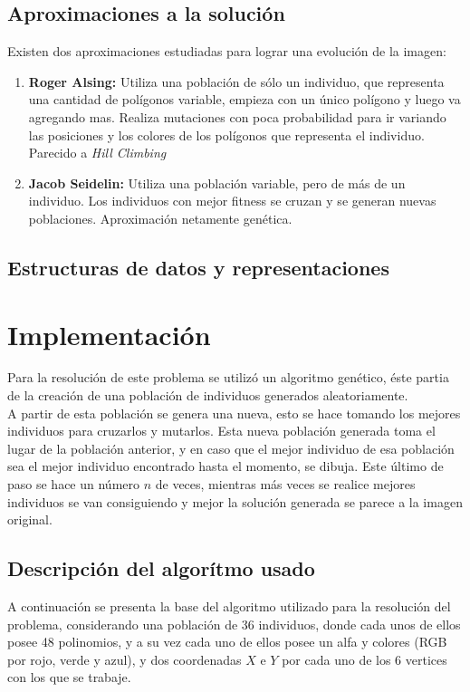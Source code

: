 \documentclass[11pt, spanish]{article}
\begin{document}
\subsection{Aproximaciones a la solución}
Existen dos aproximaciones estudiadas para lograr una evolución de la imagen:

\begin{enumerate}
	\item \textbf{Roger Alsing:} Utiliza una población de sólo un individuo, que representa una cantidad de polígonos variable, empieza con un único polígono y luego va agregando mas. Realiza mutaciones con poca probabilidad para ir variando las posiciones y los colores de los polígonos que representa el individuo. Parecido a \emph{Hill Climbing}
	\item \textbf{Jacob Seidelin:} Utiliza una población variable, pero de más de un individuo. Los individuos con mejor fitness se cruzan y se generan nuevas poblaciones. Aproximación netamente genética.
	\end{enumerate}

\subsection{Estructuras de datos y representaciones}

\section{Implementación}
Para la resolución de este problema se utilizó un algoritmo genético, éste partia de la creación de una población de individuos generados aleatoriamente. \\

A partir de esta población se genera una nueva, esto se hace tomando los mejores individuos para cruzarlos y mutarlos. Esta nueva población generada toma el lugar de la población anterior, y en caso que el mejor individuo de esa población sea el mejor individuo encontrado hasta el momento, se dibuja. Este último de paso se hace un número $n$ de veces, mientras más veces se realice mejores individuos se van consiguiendo y mejor la solución generada se parece a la imagen original. \\

\subsection{Descripción del algorítmo usado}
A continuación se presenta la base del algoritmo utilizado para la resolución del problema, considerando una población de 36 individuos, donde cada unos de ellos posee 48 polinomios, y a su vez cada uno de ellos posee un alfa y colores (RGB por rojo, verde y azul), y dos coordenadas $X$ e $Y$ por cada uno de los 6 vertices con los que se trabaje. \\
\end{document}
